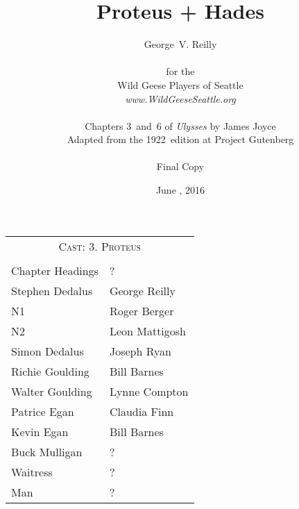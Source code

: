 



\title{\Huge Proteus + Hades}
\author{George~V. Reilly\\
\\
{\small for the}\\
Wild Geese Players of Seattle\\
{\emph{www.WildGeeseSeattle.org}}\\
\\
{\small Chapters 3~and~6 of \emph{Ulysses} by James Joyce}\\
{\small Adapted from the 1922~edition at Project Gutenberg}
\\
\\
{\small Final Copy}}
\date{June , 2016}
\raggedbottom



\maketitle
\thispagestyle{empty}
\pagebreak

\begin{tabular}{lp{10cm}}
    \multicolumn{2}{c}{\Large \textsc{Cast: 3. Proteus}} \\
\\
Chapter Headings & ? \\
Stephen Dedalus & George Reilly \\
N1  & Roger Berger \\
N2  & Leon Mattigosh \\
Simon Dedalus  & Joseph Ryan \\
Richie Goulding  & Bill Barnes \\
Walter Goulding  & Lynne Compton \\
Patrice Egan  & Claudia Finn \\
Kevin Egan  & Bill Barnes \\
Buck Mulligan  & ?\\
Waitress  & ?\\
Man  & ?\\
\end{tabular}

\bigskip
\bigskip

